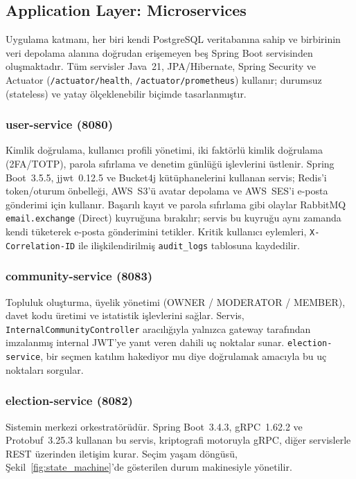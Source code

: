 \documentclass[a4paper,fleqn]{cas-sc}
\begin{document}
\subsection{Application Layer: Microservices}
\label{subsec:microservices}

Uygulama katmanı, her biri kendi PostgreSQL veritabanına sahip ve
birbirinin veri depolama alanına doğrudan erişemeyen beş Spring Boot
servisinden oluşmaktadır. Tüm servisler Java~21, JPA/Hibernate,
Spring Security ve Actuator (\texttt{/actuator/health},
\texttt{/actuator/prometheus}) kullanır; durumsuz (stateless) ve yatay
ölçeklenebilir biçimde tasarlanmıştır.

\subsubsection{user-service (8080)}

Kimlik doğrulama, kullanıcı profili yönetimi, iki faktörlü kimlik
doğrulama (2FA/TOTP), parola sıfırlama ve denetim günlüğü işlevlerini
üstlenir.
Spring Boot~3.5.5, jjwt~0.12.5 ve Bucket4j kütüphanelerini kullanan
servis; Redis'i token/oturum önbelleği, AWS~S3'ü avatar depolama ve
AWS~SES'i e-posta gönderimi için kullanır.
Başarılı kayıt ve parola sıfırlama gibi olaylar RabbitMQ
\texttt{email.exchange} (Direct) kuyruğuna bırakılır; servis bu kuyruğu
aynı zamanda kendi tüketerek e-posta gönderimini tetikler.
Kritik kullanıcı eylemleri, \texttt{X-Correlation-ID} ile ilişkilendirilmiş
\texttt{audit\_logs} tablosuna kaydedilir.

\subsubsection{community-service (8083)}

Topluluk oluşturma, üyelik yönetimi (OWNER / MODERATOR / MEMBER),
davet kodu üretimi ve istatistik işlevlerini sağlar.
Servis, \texttt{InternalCommunityController} aracılığıyla yalnızca
gateway tarafından imzalanmış internal JWT'ye yanıt veren dahili
uç noktalar sunar.
\texttt{election-service}, bir seçmen katılım hakediyor mu diye
doğrulamak amacıyla bu uç noktaları sorgular.

\subsubsection{election-service (8082)}

Sistemin merkezi orkestratörüdür. Spring Boot~3.4.3, gRPC~1.62.2
ve Protobuf~3.25.3 kullanan bu servis, kriptografi motoruyla gRPC,
diğer servislerle REST üzerinden iletişim kurar.
Seçim yaşam döngüsü, Şekil~\ref{fig:state_machine}'de gösterilen
durum makinesiyle yönetilir.
\end{document}
